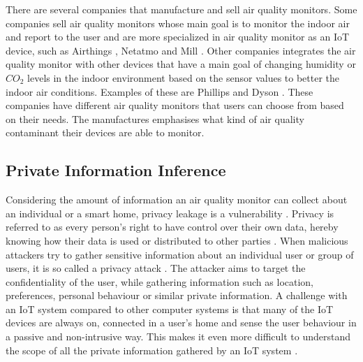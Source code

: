 There are several companies that manufacture and sell air quality monitors. Some companies sell air quality monitors whose main goal is to monitor the indoor air and report to the user and are more specialized in air quality monitor as an \gls{IoT} device, such as Airthings \cite{Airthings}, Netatmo \cite{Netatmo} and Mill \cite{Mill}. Other companies integrates the air quality monitor with other devices that have a main goal of changing humidity or \(CO_2\) levels in the indoor environment based on the sensor values to better the indoor air conditions. Examples of these are Phillips \cite{Philips} and Dyson \cite{Dyson}. These companies have different air quality monitors that users can choose from based on their needs. The manufactures emphasises what kind of air quality contaminant their devices are able to monitor. 

\subsection{Private Information Inference}
Considering the amount of information an air quality monitor can collect about an individual or a smart home, privacy leakage is a vulnerability \cite{SecPrivSmartCity}. Privacy is referred to as every person's right to have control over their own data, hereby knowing how their data is used or distributed to other parties \cite{IoTSecPrivSafeEth}. When malicious attackers try to gather sensitive information about an individual user or group of users, it is so called a privacy attack \cite{CyberEntitySecInIoT}. The attacker aims to target the confidentiality of the user, while gathering information such as location, preferences, personal behaviour or similar private information. A challenge with an \gls{IoT} system compared to other computer systems is that many of the \gls{IoT} devices are always on, connected in a user's home and sense the user behaviour in a passive and non-intrusive way. This makes it even more difficult to understand the scope of all the private information gathered by an \gls{IoT} system \cite{IoTSecPrivSafeEth}.

